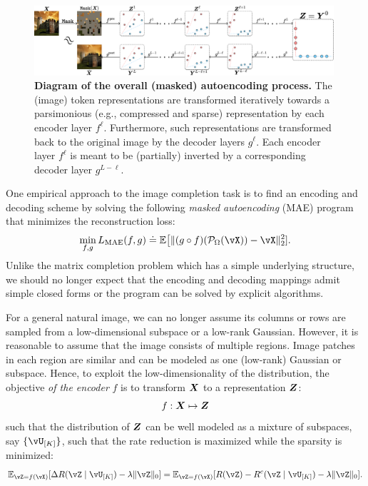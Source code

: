 \documentclass[../../book-main.tex]{subfiles}
\begin{document}
\begin{figure}[t!]
\begin{center}
  \includegraphics[width=0.99\textwidth]{figs_chap5/crate_mae_pipeline.png}
\end{center}
\caption{\small \textbf{Diagram of the overall  (masked)
  autoencoding process.} The (image) token representations are
  transformed iteratively towards a parsimonious (e.g., compressed
  and sparse) representation by each encoder layer \(f^{\ell}\).
  Furthermore, such representations are transformed back to the
  original image by the decoder layers \(g^{\ell}\). Each encoder
  layer \(f^{\ell}\) is meant to be (partially) inverted by a
corresponding decoder layer \(g^{L - \ell}\).}
\label{fig:crate_mae_pipeline}
\end{figure}

One empirical approach to the image completion task is to find an encoding and decoding scheme by
solving the following {\em masked autoencoding} (MAE) program that
minimizes the reconstruction loss:
\begin{equation}\label{eq:mae_loss}
\min_{f, g} L_{\mathrm{MAE}}(f, g) \doteq \mathbb{E}\big[\norm{(g \circ
f)(\mathcal{P}_\Omega(\vX)) - \vX}_{2}^{2}].
\end{equation}
Unlike the matrix completion problem which has a simple underlying
structure, we should no longer expect that the encoding and decoding
mappings admit simple closed forms or the program can be solved by
explicit algorithms.

For a general natural image, we can no longer assume its columns or
rows are sampled from a low-dimensional subspace or a low-rank
Gaussian. However, it is reasonable to assume that the image consists
of multiple regions. Image patches in each region are similar and can
be modeled as one (low-rank) Gaussian or subspace. Hence, to exploit
the low-dimensionality of the distribution, the objective \textit{of the
encoder} $f$ is to transform $\bm{X}$ to a representation $\bm{Z}$:
\begin{equation}
    f: \bm{X} \mapsto \bm{Z}
\end{equation}
such that the distribution of $\bm{Z}$ can be well modeled as a mixture of subspaces, say $\{\vU_{[K]}\}$,
such that the rate reduction is maximized while the sparsity is minimized:
\begin{equation}\label{eq:sparse_rr}
\mathbb{E}_{\vZ = f(\vX)}[\Delta R(\vZ \mid \vU_{[K]}) - \lambda
\norm{\vZ}_{0}] = \mathbb{E}_{\vZ = f(\vX)}[R(\vZ) - R^{c}(\vZ \mid
\vU_{[K]}) - \lambda \norm{\vZ}_{0}].
\end{equation}
\end{document}
